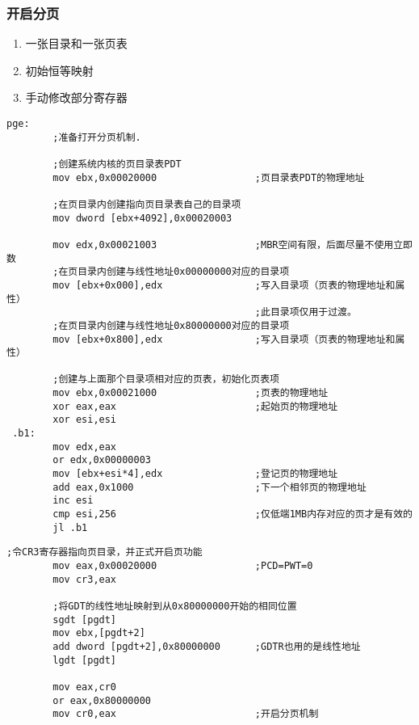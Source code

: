 \documentclass[a4paper,11pt,UTF8]{ctexart}
\begin{document}
		\subsubsection{开启分页}
			\begin{enumerate}
				\item 一张目录和一张页表
				\item 初始恒等映射
				\item 手动修改部分寄存器
			\end{enumerate}
	\begin{lstlisting}[caption={手动完善页目录和页表},tabsize=4,basicstyle=\footnotesize,captionpos=b]
		pge:
		;准备打开分页机制.
			 
		;创建系统内核的页目录表PDT
		mov ebx,0x00020000                 ;页目录表PDT的物理地址
		
		;在页目录内创建指向页目录表自己的目录项
		mov dword [ebx+4092],0x00020003 

		mov edx,0x00021003                 ;MBR空间有限，后面尽量不使用立即数
		;在页目录内创建与线性地址0x00000000对应的目录项
		mov [ebx+0x000],edx                ;写入目录项（页表的物理地址和属性）      
										   ;此目录项仅用于过渡。
		;在页目录内创建与线性地址0x80000000对应的目录项
		mov [ebx+0x800],edx                ;写入目录项（页表的物理地址和属性）

		;创建与上面那个目录项相对应的页表，初始化页表项 
		mov ebx,0x00021000                 ;页表的物理地址
		xor eax,eax                        ;起始页的物理地址 
		xor esi,esi
 .b1:       
		mov edx,eax
		or edx,0x00000003                                                      
		mov [ebx+esi*4],edx                ;登记页的物理地址
		add eax,0x1000                     ;下一个相邻页的物理地址 
		inc esi
		cmp esi,256                        ;仅低端1MB内存对应的页才是有效的 
		jl .b1
	\end{lstlisting}

	\begin{lstlisting}[caption={start paging},tabsize=4,basicstyle=\footnotesize,captionpos=b]
		;令CR3寄存器指向页目录，并正式开启页功能 
		mov eax,0x00020000                 ;PCD=PWT=0
		mov cr3,eax

		;将GDT的线性地址映射到从0x80000000开始的相同位置 
		sgdt [pgdt]
		mov ebx,[pgdt+2]
		add dword [pgdt+2],0x80000000      ;GDTR也用的是线性地址
		lgdt [pgdt]

		mov eax,cr0
		or eax,0x80000000
		mov cr0,eax                        ;开启分页机制
	\end{lstlisting}
\end{document}
